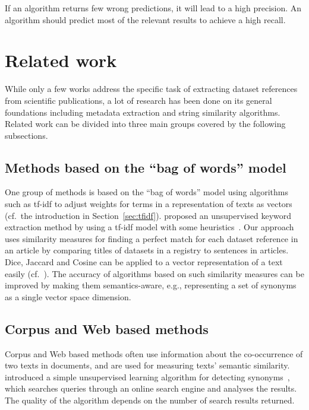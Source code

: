 \documentclass{IOS-Book-Article}
\begin{document}
If an algorithm returns few wrong predictions, it will lead to a high precision.
An algorithm should predict most of the relevant results to achieve a high recall.


\section{Related work}
\label{sec:relWork}
While only a few works address the specific task of extracting dataset references from scientific publications, a lot of research has been done on its general foundations including metadata extraction and string similarity algorithms. 
Related work can be divided into three main groups covered by the following subsections.
\subsection{Methods based on the “bag of words” model}
One group of methods is based on the “bag of words” model using algorithms such as tf-idf to adjust weights for terms in a representation of texts as vectors (cf.\ the introduction in Section~\ref{sec:tfidf}).
\citeauthor{Lee2008} proposed an unsupervised keyword extraction method by using a tf-idf model with some heuristics~\cite{Lee2008}.
Our approach uses similarity measures for finding a perfect match for each dataset reference in an article by comparing titles of datasets in a registry to sentences in articles.
Dice, Jaccard and Cosine can be applied to a vector representation of a text easily (cf.~\citet{ChristopherD1999}).
The accuracy of algorithms based on such similarity measures can be improved by making them semantics-aware, e.g., representing a set of synonyms as a single vector space dimension.

\subsection{Corpus and Web based methods}
Corpus and Web based methods often use information about the co-occurrence of two texts in documents, and are used for measuring texts' semantic similarity.
\citeauthor{Turney2001} introduced a simple unsupervised learning algorithm for detecting synonyms~\cite{Turney2001}, which searches queries through an online search engine and analyses the results.
The quality of the algorithm depends on the number of search results returned.  
\end{document}
